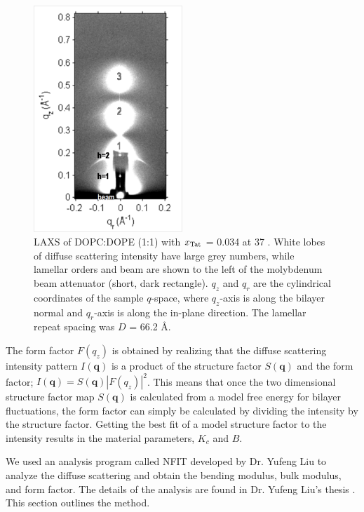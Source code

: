 \begin{figure}[htbp]
  \centering
  \includegraphics[width=0.5\textwidth]{figures/Tat/figure1}
  \caption{LAXS of DOPC:DOPE (1:1) with $x_\textrm{Tat}$ = 0.034 at 37 \textcelsius. 
  White lobes of diffuse scattering intensity have large grey numbers, while
  lamellar orders and beam are shown to the left of the
  molybdenum beam attenuator (short, dark rectangle). $q_z$ and $q_r$ are the 
  cylindrical coordinates of the sample $q$-space, where $q_z$-axis is along 
  the bilayer normal and $q_r$-axis is along the in-plane direction. 
  The lamellar repeat spacing was $D$ = 66.2 \AA.}
  \label{fig:figure1}
\end{figure}

The form factor $F(q_z)$ is obtained by realizing that the diffuse scattering
intensity pattern $I(\mathbf{q})$ is a product of the structure factor $S(\mathbf{q})$ and
the form factor; $I(\mathbf{q})= S(\mathbf{q})|F(q_z)|^2$. This means that 
once the two dimensional structure factor map $S(\mathbf{q})$ is calculated 
from a model free energy for bilayer fluctuations, the form factor can simply
be calculated by dividing the intensity by the structure factor. 
Getting the best fit of a model structure factor to the intensity results in 
the material parameters, $K_c$ and $B$.

We used an analysis program called NFIT developed by Dr. Yufeng Liu
\cite{Lyatskaya01,Liu04,Liu03} to analyze the diffuse scattering and
obtain the bending modulus, bulk modulus, and form factor. 
The details of the analysis are found in Dr. Yufeng Liu's thesis 
\cite{Liu03}. This section outlines the method. 

